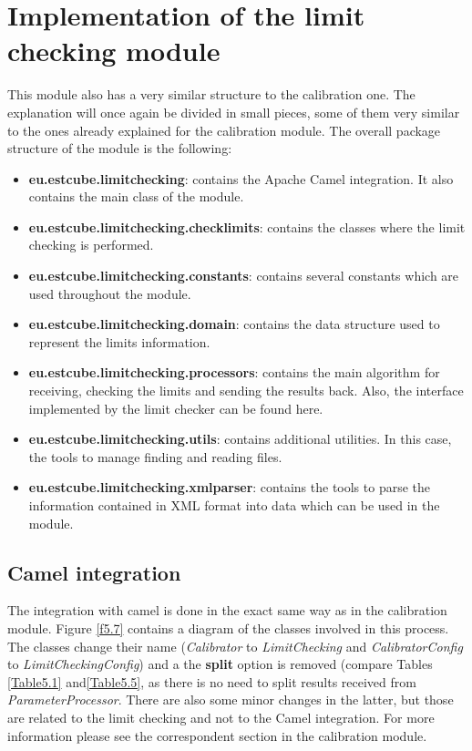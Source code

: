 \section{Implementation of the limit checking module}

This module also has a very similar structure to the calibration one. The explanation will once again be divided in small pieces, some of them very similar to the ones already explained for the calibration module. The overall package structure of the module is the following:

\begin{itemize}
\item \textbf{eu.estcube.limitchecking}: contains the Apache Camel integration. It also contains the main class of the module.
\item \textbf{eu.estcube.limitchecking.checklimits}: contains the classes where the limit checking is performed.
\item \textbf{eu.estcube.limitchecking.constants}: contains several constants which are used throughout the module.
\item \textbf{eu.estcube.limitchecking.domain}: contains the data structure used to represent the limits information.
\item \textbf{eu.estcube.limitchecking.processors}: contains the main algorithm for receiving, checking the limits and sending the results back. Also, the interface implemented by the limit checker can be found here.
\item \textbf{eu.estcube.limitchecking.utils}: contains additional utilities. In this case, the tools to manage finding and reading files.
\item \textbf{eu.estcube.limitchecking.xmlparser}: contains the tools to parse the information contained in XML format into data which can be used in the module.
\end{itemize}
\subsection{Camel integration}

The integration with camel is done in the exact same way as in the calibration module. Figure \ref{f5.7} contains a diagram of the classes involved in this process. The classes change their name (\emph{Calibrator} to \emph{LimitChecking} and \emph{CalibratorConfig} to \emph{LimitCheckingConfig}) and a the \textbf{split} option is removed (compare Tables \ref{Table5.1} and\ref{Table5.5}, as there is no need to split results received from \emph{ParameterProcessor}. There are also some minor changes in the latter, but those are related to the limit checking and not to the Camel integration. For more information please see the correspondent section in the calibration module.

